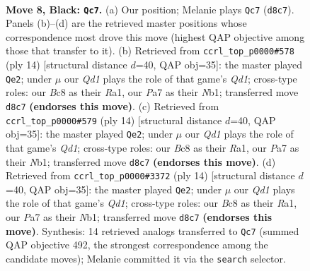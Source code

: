 \documentclass[11pt]{article}
\begin{document}
\begin{figure}[p]\centering
\begin{subfigure}{0.46\textwidth}\centering
\resizebox{\linewidth}{!}{%
\newchessgame
\chessboard[
  setfen={rnbq1rk1/pp2bppp/4pn2/2Pp4/3P4/2N2N2/PP2BPPP/R1BQK2R b KQ - 2 8},
  showmover=false,
  pgfstyle=straightmove, color=movearrow, markmove={d8-c7}
]}
\caption{}
\end{subfigure}\hfill
\begin{subfigure}{0.46\textwidth}\centering
\resizebox{\linewidth}{!}{%
\newchessgame
\chessboard[
  setfen={r2qkb1r/1ppb1ppp/p1n1pn2/8/2pP4/4PNP1/PP3PBP/RNBQ1RK1 w kq - 1 8},
  showmover=false,
  pgfstyle=straightmove, color=movearrow, markmove={d1-e2}
]}
\caption{}
\end{subfigure}
\\[4pt]
\begin{subfigure}{0.46\textwidth}\centering
\resizebox{\linewidth}{!}{%
\newchessgame
\chessboard[
  setfen={r2qkb1r/1ppb1ppp/p1n1pn2/8/2pP4/4PNP1/PP3PBP/RNBQ1RK1 w kq - 1 8},
  showmover=false,
  pgfstyle=straightmove, color=movearrow, markmove={d1-e2}
]}
\caption{}
\end{subfigure}\hfill
\begin{subfigure}{0.46\textwidth}\centering
\resizebox{\linewidth}{!}{%
\newchessgame
\chessboard[
  setfen={r2qkb1r/1ppb1ppp/p1n1pn2/8/2pP4/4PNP1/PP3PBP/RNBQ1RK1 w kq - 1 8},
  showmover=false,
  pgfstyle=straightmove, color=movearrow, markmove={d1-e2}
]}
\caption{}
\end{subfigure}
\caption{\textbf{Move 8, Black: \texttt{Qc7}.} (a) Our position; Melanie plays \texttt{Qc7} (\texttt{d8c7}). Panels (b)--(d) are the retrieved master positions whose correspondence most drove this move (highest QAP objective among those that transfer to it). (b) Retrieved from \texttt{ccrl\_top\_p0000\#578} (ply 14) [structural distance $d$=40, QAP obj=35]: the master played \texttt{Qe2}; under $\mu$ our \emph{Qd1} plays the role of that game's \emph{Qd1}; cross-type roles: our \emph{B}c8 as their \emph{R}a1, our \emph{P}a7 as their \emph{N}b1; transferred move \texttt{d8c7} \textbf{(endorses this move)}. (c) Retrieved from \texttt{ccrl\_top\_p0000\#579} (ply 14) [structural distance $d$=40, QAP obj=35]: the master played \texttt{Qe2}; under $\mu$ our \emph{Qd1} plays the role of that game's \emph{Qd1}; cross-type roles: our \emph{B}c8 as their \emph{R}a1, our \emph{P}a7 as their \emph{N}b1; transferred move \texttt{d8c7} \textbf{(endorses this move)}. (d) Retrieved from \texttt{ccrl\_top\_p0000\#3372} (ply 14) [structural distance $d$=40, QAP obj=35]: the master played \texttt{Qe2}; under $\mu$ our \emph{Qd1} plays the role of that game's \emph{Qd1}; cross-type roles: our \emph{B}c8 as their \emph{R}a1, our \emph{P}a7 as their \emph{N}b1; transferred move \texttt{d8c7} \textbf{(endorses this move)}. Synthesis: 14 retrieved analogs transferred to \texttt{Qc7} (summed QAP objective 492, the strongest correspondence among the candidate moves); Melanie committed it via the \texttt{search} selector.}
\label{fig:thought-m15}
\end{figure}
\end{document}
